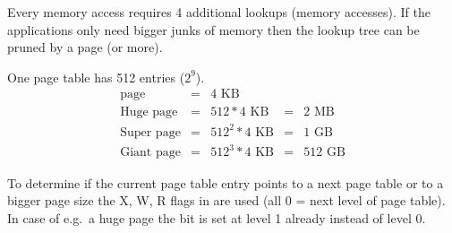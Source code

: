 \newpar{}

Every memory access requires 4 additional lookups (memory accesses). If the applications only need bigger junks of memory then the lookup tree can be pruned by a page (or more).

\newpar{}
One page table has 512 entries ($2^9$).
\begin{align*}
    \text{page}       & = & 4\text{~KB}         &   &               \\
    \text{Huge page}  & = & 512 * 4\text{~KB}   & = & 2\text{~MB}   \\
    \text{Super page} & = & 512^2 * 4\text{~KB} & = & 1\text{~GB}   \\
    \text{Giant page} & = & 512^3 * 4\text{~KB} & = & 512\text{~GB}
\end{align*}

To determine if the current page table entry points to a next page table or to a bigger page size the X, W, R flags in are used (all 0 = next level of page table). In case of e.g.\ a huge page the  bit is set at level 1 already instead of level 0.

